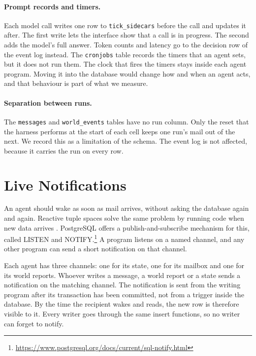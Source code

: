 \paragraph{Prompt records and timers.} Each model call writes one row to
\texttt{tick\_sidecars} before the call and updates it after. The first write
lets the interface show that a call is in progress. The second adds the
model's full answer. Token counts and latency go to the decision row of the
event log instead. The \texttt{cronjobs} table records the
timers that an agent sets, but it does not run them. The clock that fires the
timers stays inside each agent program. Moving it into the database would
change how and when an agent acts, and that behaviour is part of what we
measure.

\paragraph{Separation between runs.} The \texttt{messages} and
\texttt{world\_events} tables have no run column. Only the reset that the
harness performs at the start of each cell keeps one run's mail out of the
next. We record this as a
limitation of the schema. The event log is not affected, because it carries
the run on every row.

\section{Live Notifications}
\label{sec:data:notify}

An agent should wake as soon as mail arrives, without asking the database
again and again. Reactive tuple spaces solve the same problem by running code
when new data arrives \parencite{omicini1999}. PostgreSQL offers a
publish-and-subscribe mechanism for this, called LISTEN and
NOTIFY.\footnote{\url{https://www.postgresql.org/docs/current/sql-notify.html}}
A program listens on a named channel, and any other program can send a short
notification on that channel.

Each agent has three channels: one for its state, one for its mailbox and one
for its world reports. Whoever writes a message, a world report or a state
sends a notification on the matching channel. The notification is sent from
the writing program after its transaction has been committed, not from a
trigger inside the database. By the time the recipient wakes and reads, the
new row is therefore visible to it. Every writer goes through the same insert
functions, so no writer can forget to notify.

